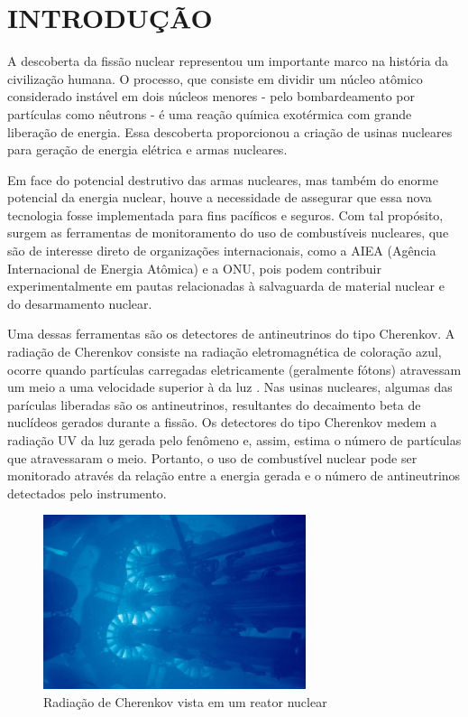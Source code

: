 \chapter{INTRODUÇÃO} \label{cap:intro}
\vspace{-2cm}

A descoberta da fissão nuclear representou um importante marco na história da civilização humana. O processo, que consiste em dividir um núcleo atômico considerado instável em dois núcleos menores - pelo bombardeamento por partículas como nêutrons - é uma reação química exotérmica com grande liberação de energia. Essa descoberta proporcionou a criação de usinas nucleares para geração de energia elétrica e armas nucleares. 

Em face do potencial destrutivo das armas nucleares, mas também do enorme potencial da energia nuclear, houve a necessidade de assegurar que essa nova tecnologia fosse implementada para fins pacíficos e seguros. Com tal propósito, surgem as ferramentas de monitoramento do uso de combustíveis nucleares, que são de interesse direto de organizações internacionais, como a AIEA (Agência Internacional de Energia Atômica) e a ONU, pois podem contribuir experimentalmente em pautas relacionadas à salvaguarda de material nuclear e do desarmamento nuclear.

Uma dessas ferramentas são os detectores de antineutrinos do tipo Cherenkov. A radiação de Cherenkov consiste na radiação eletromagnética de coloração azul, ocorre quando partículas carregadas eletricamente (geralmente fótons) atravessam um meio a uma velocidade superior à da luz \cite{leo2012techniques}. Nas usinas nucleares, algumas das parículas liberadas são os antineutrinos, resultantes do decaimento beta de nuclídeos gerados durante a fissão. Os detectores do tipo Cherenkov medem a radiação UV da luz gerada pelo fenômeno e, assim, estima o número de partículas que atravessaram o meio. Portanto, o uso de combustível nuclear pode ser monitorado através da relação entre a energia gerada e o número de antineutrinos detectados pelo instrumento.


\begin{figure}[H]
	\centering
		\includegraphics[width=7.7cm]{textuais/introducao/figuras/Cherenkov1.jpg}
		\caption{Radiação de Cherenkov vista em um reator nuclear}
		\label{fig:cherenkov}
\end{figure}%

